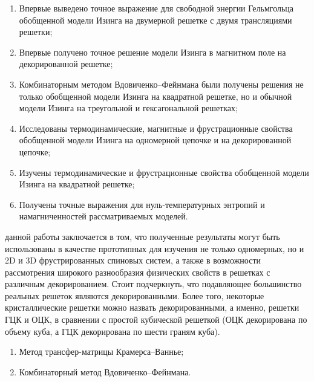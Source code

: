 {\novelty}
\begin{enumerate}[beginpenalty=10000] %
  \item Впервые выведено точное выражение для свободной энергии Гельмгольца обобщенной модели Изинга на двумерной решетке с двумя трансляциями решетки;
  \item Впервые получено точное решение модели Изинга в магнитном поле на декорированной решетке;
  \item Комбинаторным методом Вдовиченко--Фейнмана были получены решения не только обобщенной модели Изинга на квадратной решетке, но и обычной модели Изинга на треугольной и гексагональной решетках;
  \item Исследованы термодинамические, магнитные и фрустрационные свойства обобщенной модели Изинга на одномерной цепочке и на декорированной цепочке;
  \item Изучены термодинамические и фрустрационные свойства обобщенной модели Изинга на квадратной решетке;
  \item Получены точные выражения для нуль-температурных энтропий и намагниченностей рассматриваемых моделей.
\end{enumerate}

{\influence} данной работы заключается в том, что полученные результаты могут быть использованы в качестве прототипных для изучения не только одномерных, но и 2D и 3D фрустрированных спиновых систем, а также в возможности рассмотрения широкого разнообразия физических свойств в решетках с различным декорированием. Стоит подчеркнуть, что подавляющее большинство реальных решеток являются декорированными. Более того, некоторые кристаллические решетки можно назвать декорированными, а именно, решетки ГЦК и ОЦК, в сравнении с простой кубической решеткой (ОЦК декорирована по объему куба, а ГЦК декорирована по шести граням куба).

{\methods}
\begin{enumerate}[beginpenalty=10000] 
  \item Метод трансфер-матрицы Крамерса--Ваннье;
  \item Комбинаторный метод Вдовиченко--Фейнмана.
\end{enumerate}

